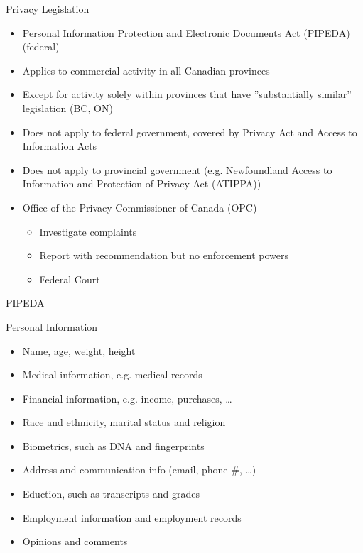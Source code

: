 \documentclass[ignorenonframetext,xcolor=x11names]{beamer}
\begin{document}
\begin{frame}[label=full]{Privacy Legislation}
  \begin{itemize}
     \item Personal Information Protection and Electronic Documents Act (PIPEDA) (federal)
     \item Applies to commercial activity in all Canadian provinces
     \item Except for activity solely within provinces that have ''substantially similar'' legislation (BC, ON)
     \item Does not apply to federal government, covered by Privacy Act and Access to Information Acts
     \item Does not apply to provincial government (e.g. Newfoundland Access to Information and Protection of Privacy Act (ATIPPA))
  \end{itemize}
\begin{itemize}
   \item Office of the Privacy Commissioner of Canada (OPC)
   \begin{itemize}
      \item Investigate complaints
      \item Report with recommendation but no enforcement powers
      \item Federal Court
   \end{itemize}
\end{itemize}
\end{frame}

\begin{frame}[label=full]{PIPEDA}
  \begin{block}{Personal Information}
    \begin{itemize}
       \item Name, age, weight, height
       \item Medical information, e.g. medical records
       \item Financial information, e.g. income, purchases, \ldots
       \item Race and ethnicity, marital status and religion
       \item Biometrics, such as DNA and fingerprints
       \item Address and communication info (email, phone \#, \ldots)
       \item Eduction, such as transcripts and grades
       \item Employment information and employment records
       \item Opinions and comments
    \end{itemize} 
  \end{block}
\end{frame}
\end{document}
